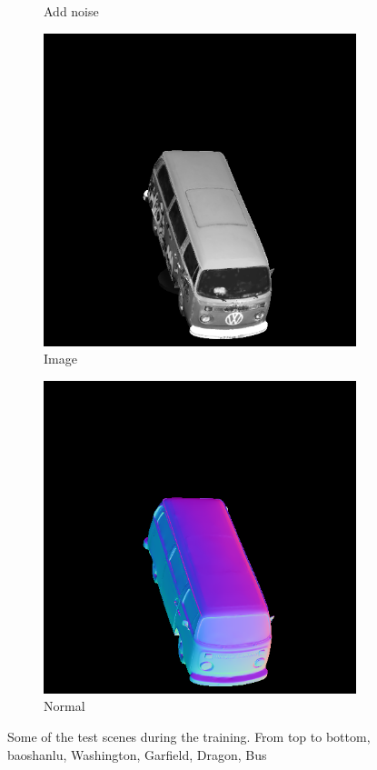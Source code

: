 \documentclass[border=15pt, multi, tikz]{article}
\begin{document}
\begin{figure}[H]
\begin{subfigure}[b]{0.20\linewidth}
		\caption{Add noise}
	\end{subfigure}
	\begin{subfigure}[b]{0.20\linewidth}
		\includegraphics[width=\linewidth]{./Figures/test_scenes/05126.image0.png}
		\caption{Image}
	\end{subfigure}
	\begin{subfigure}[b]{0.20\linewidth}
		\includegraphics[width=\linewidth]{./Figures/test_scenes/05126.normal0.png}
		\caption{Normal}
	\end{subfigure}
	
	\caption{Some of the test scenes during the training. From top to bottom, baoshanlu, Washington, Garfield, Dragon, Bus}
	\label{fig:test-scene}
\end{figure}
\end{document}
